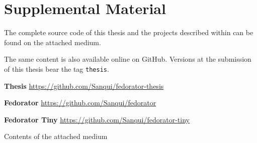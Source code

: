 \chapter{Supplemental Material}

The complete source code of this thesis and the projects described within can be found on the attached medium.  

The same content is also available online on GitHub.  Versions at the submission of this thesis bear the tag \texttt{thesis}.

\noindent \textbf{Thesis} \hfill
    \url{https://github.com/Sanqui/fedorator-thesis}

\noindent \textbf{Fedorator} \hfill
    \url{https://github.com/Sanqui/fedorator}
    
\noindent \textbf{Fedorator Tiny} \hfill
    \url{https://github.com/Sanqui/fedorator-tiny}

\vfill

\begin{dirfigure}%
\caption{Contents of the attached medium}
\end{dirfigure}
